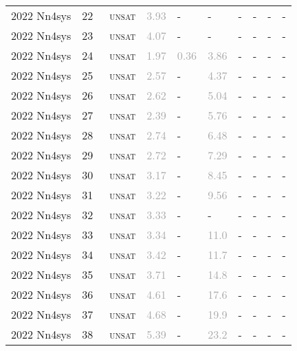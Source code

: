 \begin{center}
{\begin{longtable}{@{}llllllllll@{}}
2022 Nn4sys & 22 & ~\textsc{unsat} & \textcolor{darkgray}{3.93} & - & - & - & - & - & - \\
2022 Nn4sys & 23 & ~\textsc{unsat} & \textcolor{darkgray}{4.07} & - & - & - & - & - & - \\
2022 Nn4sys & 24 & ~\textsc{unsat} & \textcolor{darkgray}{1.97} & \textcolor{darkgray}{0.36} & \textcolor{darkgray}{3.86} & - & - & - & - \\
2022 Nn4sys & 25 & ~\textsc{unsat} & \textcolor{darkgray}{2.57} & - & \textcolor{darkgray}{4.37} & - & - & - & - \\
2022 Nn4sys & 26 & ~\textsc{unsat} & \textcolor{darkgray}{2.62} & - & \textcolor{darkgray}{5.04} & - & - & - & - \\
2022 Nn4sys & 27 & ~\textsc{unsat} & \textcolor{darkgray}{2.39} & - & \textcolor{darkgray}{5.76} & - & - & - & - \\
2022 Nn4sys & 28 & ~\textsc{unsat} & \textcolor{darkgray}{2.74} & - & \textcolor{darkgray}{6.48} & - & - & - & - \\
2022 Nn4sys & 29 & ~\textsc{unsat} & \textcolor{darkgray}{2.72} & - & \textcolor{darkgray}{7.29} & - & - & - & - \\
2022 Nn4sys & 30 & ~\textsc{unsat} & \textcolor{darkgray}{3.17} & - & \textcolor{darkgray}{8.45} & - & - & - & - \\
2022 Nn4sys & 31 & ~\textsc{unsat} & \textcolor{darkgray}{3.22} & - & \textcolor{darkgray}{9.56} & - & - & - & - \\
2022 Nn4sys & 32 & ~\textsc{unsat} & \textcolor{darkgray}{3.33} & - & - & - & - & - & - \\
2022 Nn4sys & 33 & ~\textsc{unsat} & \textcolor{darkgray}{3.34} & - & \textcolor{darkgray}{11.0} & - & - & - & - \\
2022 Nn4sys & 34 & ~\textsc{unsat} & \textcolor{darkgray}{3.42} & - & \textcolor{darkgray}{11.7} & - & - & - & - \\
2022 Nn4sys & 35 & ~\textsc{unsat} & \textcolor{darkgray}{3.71} & - & \textcolor{darkgray}{14.8} & - & - & - & - \\
2022 Nn4sys & 36 & ~\textsc{unsat} & \textcolor{darkgray}{4.61} & - & \textcolor{darkgray}{17.6} & - & - & - & - \\
2022 Nn4sys & 37 & ~\textsc{unsat} & \textcolor{darkgray}{4.68} & - & \textcolor{darkgray}{19.9} & - & - & - & - \\
2022 Nn4sys & 38 & ~\textsc{unsat} & \textcolor{darkgray}{5.39} & - & \textcolor{darkgray}{23.2} & - & - & - & - \\

\end{longtable}}
\end{center}
